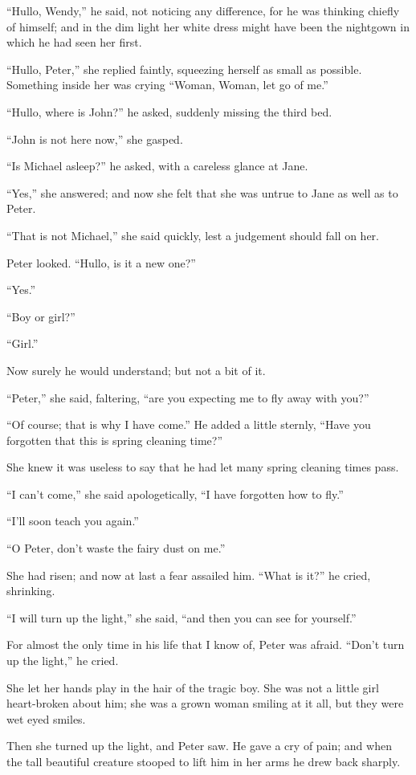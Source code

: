 “Hullo, Wendy,” he said, not noticing any difference,
for he was thinking chiefly of himself;
and in the dim light her white dress might have been the nightgown in which he had seen her first.

“Hullo, Peter,” she replied faintly, squeezing herself as small as possible.
Something inside her was crying “Woman, Woman, let go of me.”

“Hullo, where is John?\@” he asked, suddenly missing the third bed.

“John is not here now,” she gasped.

“Is Michael asleep?\@” he asked, with a careless glance at Jane.

“Yes,” she answered;
and now she felt that she was untrue to Jane as well as to Peter.

“That is not Michael,” she said quickly,
lest a judgement should fall on her.

Peter looked.
“Hullo, is it a new one?”

“Yes.”

“Boy or girl?”

“Girl.”

Now surely he would understand;
but not a bit of it.

“Peter,” she said, faltering, “are you expecting me to fly away with you?”

“Of course;
that is why I have come.”
He added a little sternly,
“Have you forgotten that this is spring cleaning time?”

She knew it was useless to say that he had let many spring cleaning times pass.

“I can’t come,” she said apologetically,
“I have forgotten how to fly.”

“I’ll soon teach you again.”

“O Peter, don’t waste the fairy dust on me.”

She had risen;
and now at last a fear assailed him.
“What is it?\@” he cried, shrinking.

“I will turn up the light,” she said, “and then you can see for yourself.”

For almost the only time in his life that I know of, Peter was afraid.
“Don’t turn up the light,” he cried.

She let her hands play in the hair of the tragic boy.
She was not a little girl heart-broken about him;
she was a grown woman smiling at it all,
but they were wet eyed smiles.

Then she turned up the light, and Peter saw.
He gave a cry of pain;
and when the tall beautiful creature stooped to lift him in her arms he drew back sharply.

